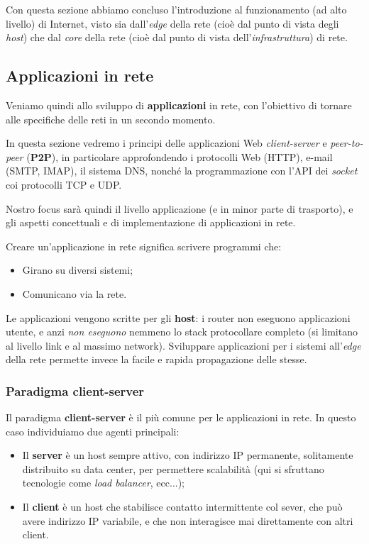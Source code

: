 \documentclass[a4paper,11pt]{article}
\begin{document}
\par\medskip

Con questa sezione abbiamo concluso l'introduzione al funzionamento (ad alto livello) di Internet, visto sia dall'\textit{edge} della rete (cioè dal punto di vista degli \textit{host}) che dal \textit{core} della rete (cioè dal punto di vista dell'\textit{infrastruttura}) di rete.

\subsection{Applicazioni in rete}
Veniamo quindi allo sviluppo di \textbf{applicazioni} in rete, con l'obiettivo di tornare alle specifiche delle reti in un secondo momento.

In questa sezione vedremo i principi delle applicazioni Web \textit{client-server} e \textit{peer-to-peer} (\textbf{P2P}), in particolare approfondendo i protocolli Web (HTTP), e-mail (SMTP, IMAP), il sistema DNS, nonché la programmazione con l'API dei \textit{socket} coi protocolli TCP e UDP.

Nostro focus sarà quindi il livello applicazione (e in minor parte di trasporto), e gli aspetti concettuali e di implementazione di applicazioni in rete.

Creare un'applicazione in rete significa scrivere programmi che:
\begin{itemize}
	\item Girano su diversi sistemi;
	\item Comunicano via la rete.
\end{itemize}

Le applicazioni vengono scritte per gli \textbf{host}: i router non eseguono applicazioni utente, e anzi \textit{non eseguono} nemmeno lo stack protocollare completo (si limitano al livello link e al massimo network).
Sviluppare applicazioni per i sistemi all'\textit{edge} della rete permette invece la facile e rapida propagazione delle stesse.

\subsubsection{Paradigma client-server}
Il paradigma \textbf{client-server} è il più comune per le applicazioni in rete.
In questo caso individuiamo due agenti principali:
\begin{itemize}
	\item Il \textbf{server} è un host sempre attivo, con indirizzo IP permanente, solitamente distribuito su data center, per permettere scalabilità (qui si sfruttano tecnologie come \textit{load balancer}, ecc...);
	\item Il \textbf{client} è un host che stabilisce contatto intermittente col sever, che può avere indirizzo IP variabile, e che non interagisce mai direttamente con altri client.
\end{itemize}
\end{document}
